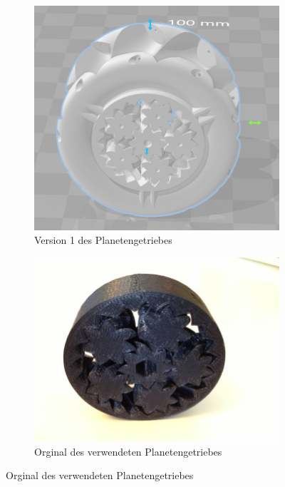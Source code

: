 \begin{figure}[!ht]
	\centering
	\begin{subfigure}[b]{0.4\textwidth}
		\includegraphics[width=\textwidth]{bilder/GetriebeVersion1-1.png}
		\caption{Version 1 des Planetengetriebes}
		\label{bild:gearversion1-1}
	\end{subfigure}
	\hspace{0.1\textwidth}%
	\begin{subfigure}[b]{0.4\textwidth}
		\includegraphics[width=\textwidth]{bilder/GetriebeVersion1-2.jpg}
		\caption{Orginal des verwendeten Planetengetriebes \cite{link:planetgear1}}
		\label{bild:gearversion1-2}
	\end{subfigure}
\end{figure}

